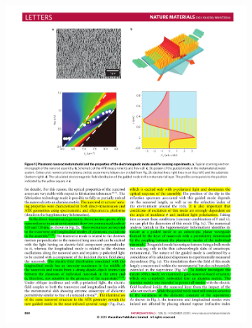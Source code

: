 \documentclass[letterpaper,11pt] {article}
\begin{document}
\begin{figure}[h!]
		\begin{subfigure}{.28\linewidth}\includegraphics[scale=.81]{0-k(w)Kobashin2009}\end{subfigure}		
		\begin{subfigure}{.01\linewidth}\caption{ }\label{sfig:PsiDelta}\vspace{3.5cm}\end{subfigure}  

\end{figure}
\end{document}
